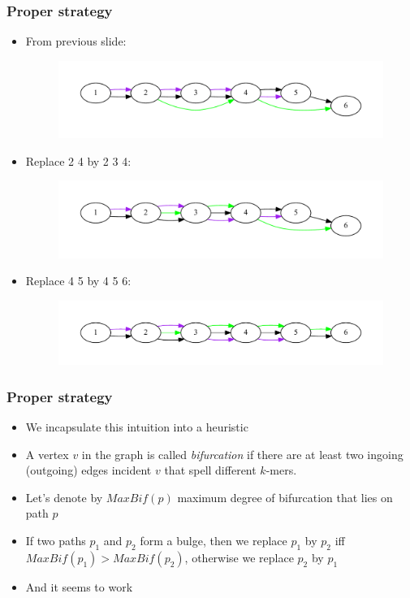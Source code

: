 \documentclass[svgnames,14pt]{beamer}
\begin{document}
\begin{frame}
\frametitle{Proper strategy}
\begin{itemize}
\item From previous slide:
\begin{changemargin}{-1.cm}{-1.cm}
\begin{figure}
\centering
\includegraphics[scale = 0.38]{graph5.pdf}
\end{figure}
\end{changemargin}
\item Replace 2 4 by 2 3 4:
\begin{changemargin}{-1.cm}{-1.cm}
\begin{figure}
\centering
\includegraphics[scale = 0.38]{graph6.pdf}
\end{figure}
\end{changemargin}
\item Replace 4 5 by 4 5 6:
\begin{changemargin}{-1.cm}{-1.cm}
\begin{figure}
\centering
\includegraphics[scale = 0.38]{graph7.pdf}
\end{figure}
\end{changemargin}
\end{itemize}
\end{frame}

\begin{frame}
\frametitle{Proper strategy}
\begin{itemize}
\item We incapsulate this intuition into a heuristic
\item A vertex \(v\) in the graph is called \textit{bifurcation} if there are at least two ingoing (outgoing) edges incident \(v\) that spell different \(k\)-mers.
\item Let's denote by \(MaxBif(p)\) maximum degree of bifurcation that lies on path \(p\)
\item If two paths \(p_1\) and \(p_2\) form a bulge, then we replace \(p_1\) by \(p_2\) iff \(MaxBif(p_1) > MaxBif(p_2)\), otherwise we replace 
\(p_2\) by \(p_1\)
\item And it seems to work
\end{itemize}
\end{frame}
\end{document}
